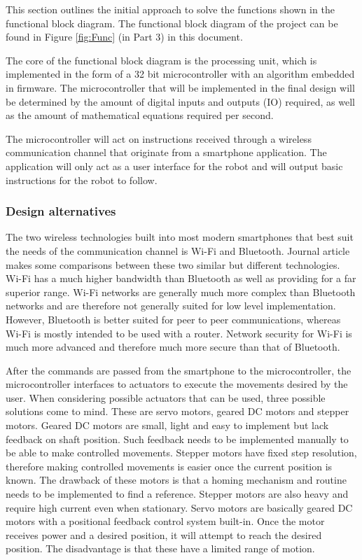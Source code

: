 This section outlines the initial approach to solve the functions shown in the functional block diagram. The functional block diagram of the project can be found in Figure \ref{fig:Func} (in Part 3) in this document.

The core of the functional block diagram is the processing unit, which is implemented in the form of a 32 bit microcontroller with an algorithm embedded in firmware. The microcontroller that will be implemented in the final design will be determined by the amount of digital inputs and outputs (IO) required, as well as the amount of mathematical equations required per second.

The microcontroller will act on instructions received through a wireless communication channel that originate from a smartphone application. The application will only act as a user interface for the robot and will output basic instructions for the robot to follow.

\subsubsection{Design alternatives}
The two wireless technologies built into most modern smartphones that best suit the needs of the communication channel is Wi-Fi and Bluetooth. Journal article \cite{Dhawan:Analogy} makes some comparisons between these two similar but different technologies. Wi-Fi has a much higher bandwidth than Bluetooth as well as providing for a far superior range. Wi-Fi networks are generally much more complex than Bluetooth networks and are therefore not generally suited for low level implementation. However, Bluetooth is better suited for peer to peer communications, whereas Wi-Fi is mostly intended to be used with a router. Network security for Wi-Fi is much more advanced and therefore much more secure than that of Bluetooth.

After the commands are passed from the smartphone to the microcontroller, the microcontroller interfaces to actuators to execute the movements desired by the user. When considering possible actuators that can be used, three possible solutions come to mind. These are servo motors, geared DC motors and stepper motors. Geared DC motors are small, light and easy to implement but lack feedback on shaft position. Such feedback needs to be implemented manually to be able to make controlled movements. Stepper motors have fixed step resolution, therefore making controlled movements is easier once the current position is known. The drawback of these motors is that a homing mechanism and routine needs to be implemented to find a reference. Stepper motors are also heavy and require high current even when stationary. Servo motors are basically geared DC motors with a positional feedback control system built-in. Once the motor  receives power and a desired position, it will attempt to reach the desired position. The disadvantage is that these have a limited range of motion.

